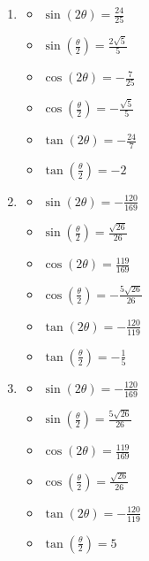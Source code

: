 \documentclass{ximera}
\begin{document}
\begin{enumerate}
\item \begin{multicols}{3}

\begin{itemize}

\item $\sin(2\theta) = \frac{24}{25}$
\item $\sin\left(\frac{\theta}{2}\right) = \frac{2\sqrt{5}}{5}$
\item $\cos(2\theta) = -\frac{7}{25}$
\item $\cos\left(\frac{\theta}{2}\right) = -\frac{\sqrt{5}}{5}$
\item $\tan(2\theta)=-\frac{24}{7} $
\item $\tan\left(\frac{\theta}{2}\right) = -2$

\end{itemize}

\end{multicols}

\item \begin{multicols}{3}

\begin{itemize}

\item $\sin(2\theta) = -\frac{120}{169}$
\item $\sin\left(\frac{\theta}{2}\right) = \frac{\sqrt{26}}{26}$
\item $\cos(2\theta) = \frac{119}{169}$
\item $\cos\left(\frac{\theta}{2}\right) = -\frac{5\sqrt{26}}{26}$
\item $\tan(2\theta)=-\frac{120}{119}$
\item $\tan\left(\frac{\theta}{2}\right) = -\frac{1}{5}$

\end{itemize}

\end{multicols}

\item \begin{multicols}{3}

\begin{itemize}

\item $\sin(2\theta) = -\frac{120}{169}$
\item $\sin\left(\frac{\theta}{2}\right) = \frac{5\sqrt{26}}{26}$
\item $\cos(2\theta) = \frac{119}{169}$
\item $\cos\left(\frac{\theta}{2}\right) = \frac{\sqrt{26}}{26}$
\item $\tan(2\theta)=-\frac{120}{119}$
\item $\tan\left(\frac{\theta}{2}\right) = 5$


\end{itemize}
\end{multicols}
\end{enumerate}
\end{document}
